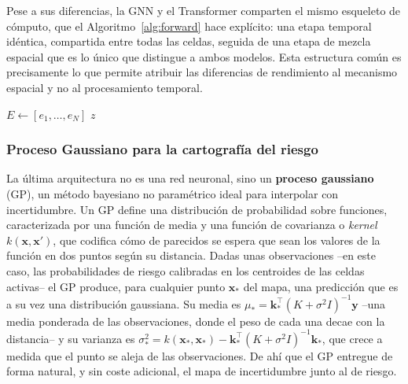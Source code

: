 Pese a sus diferencias, la GNN y el Transformer comparten el mismo esqueleto de cómputo, que
el Algoritmo~\ref{alg:forward} hace explícito: una etapa temporal idéntica, compartida entre
todas las celdas, seguida de una etapa de mezcla espacial que es lo único que distingue a
ambos modelos. Esta estructura común es precisamente lo que permite atribuir las diferencias
de rendimiento al mecanismo espacial y no al procesamiento temporal.

\begin{algorithm}[ht!]
  \caption{Paso hacia delante de los modelos espaciales (GNN / Transformer)}
  \label{alg:forward}
  \DontPrintSemicolon
  $E \leftarrow [e_1,\dots,e_N]$ 
  \Return $z$\;
\end{algorithm}

\subsubsection{Proceso Gaussiano para la cartografía del riesgo}
\label{md-arq-gp}

La última arquitectura no es una red neuronal, sino un \textbf{proceso gaussiano} (GP), un
método bayesiano no paramétrico ideal para interpolar con incertidumbre. Un GP define una
distribución de probabilidad sobre funciones, caracterizada por una función de media y una
función de covarianza o \textit{kernel} \(k(\mathbf{x},\mathbf{x}')\), que codifica cómo de
parecidos se espera que sean los valores de la función en dos puntos según su distancia. Dadas
unas observaciones --en este caso, las probabilidades de riesgo calibradas en los centroides de
las celdas activas-- el GP produce, para cualquier punto \(\mathbf{x}_*\) del mapa, una
predicción que es a su vez una distribución gaussiana. Su media es
\(\mu_* = \mathbf{k}_*^\top (K + \sigma^2 I)^{-1}\mathbf{y}\) --una media ponderada de las
observaciones, donde el peso de cada una decae con la distancia-- y su varianza es
\(\sigma_*^2 = k(\mathbf{x}_*,\mathbf{x}_*) - \mathbf{k}_*^\top (K + \sigma^2 I)^{-1}\mathbf{k}_*\),
que crece a medida que el punto se aleja de las observaciones. De ahí que el GP entregue de
forma natural, y sin coste adicional, el mapa de incertidumbre junto al de riesgo.

